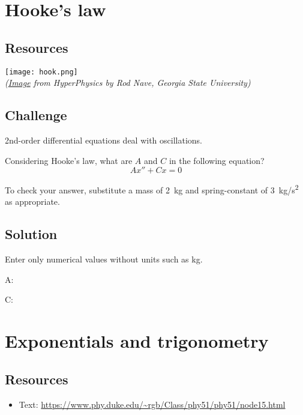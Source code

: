 \section{Hooke's law}

\subsection*{Resources}

\texttt{[image: hook.png]}\\
\emph{(\href{http://hyperphysics.phy-astr.gsu.edu/hbase/imgmec/hook.gif}{Image} from HyperPhysics by Rod Nave, Georgia State University)}

\subsection*{Challenge}
2nd-order differential equations deal with oscillations.

Considering Hooke's law, what are $A$ and $C$ in the following equation?
\begin{equation}
    A x'' + C x = 0
\end{equation}

To check your answer, substitute a mass of \SI{2}{kg} and spring-constant of \SI{3}{kg/s^2} as appropriate.

\subsection*{Solution}
Enter only numerical values without units such as kg.

A: 

C: 




\newpage
\section{Exponentials and trigonometry}

\subsection*{Resources}
\begin{itemize}
    \item Text: \url{https://www.phy.duke.edu/~rgb/Class/phy51/phy51/node15.html}
\end{itemize}

